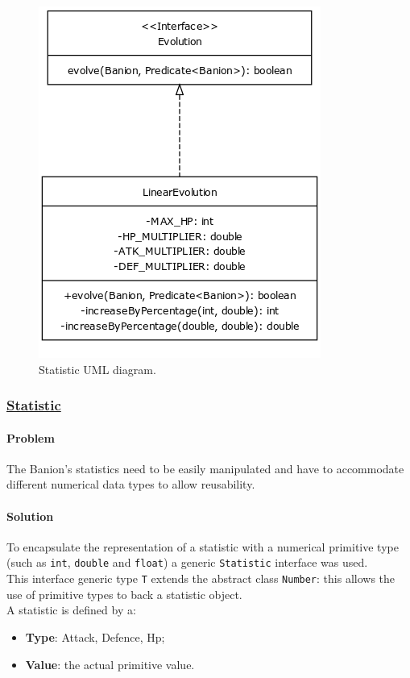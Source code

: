 \documentclass[12pt, a4paper]{report}
\theoremstyle{definition}
\begin{document}
    \begin{figure}[h]
    \centering{}
    \caption{Statistic UML diagram.}
    \includegraphics[scale=0.8]{evolution_uml}
    \end{figure}

    \subsubsection{\underline{Statistic}}
    \paragraph{Problem}
    The Banion's statistics need to be easily manipulated and have to accommodate different numerical data types to allow reusability.
    \paragraph{Solution}
    To encapsulate the representation of a statistic with a numerical primitive type (such as \verb|int|, \verb|double| and \verb|float|)
    a generic \verb|Statistic| interface was used.\\
    This interface generic type \verb|T| extends the abstract class \verb|Number|: this allows the use of primitive types to back a statistic object.\\
    A statistic is defined by a:

    \begin{itemize}
        \item \textbf{Type}: Attack, Defence, Hp;
        \item \textbf{Value}: the actual primitive value.
    \end{itemize}
    
\end{document}
